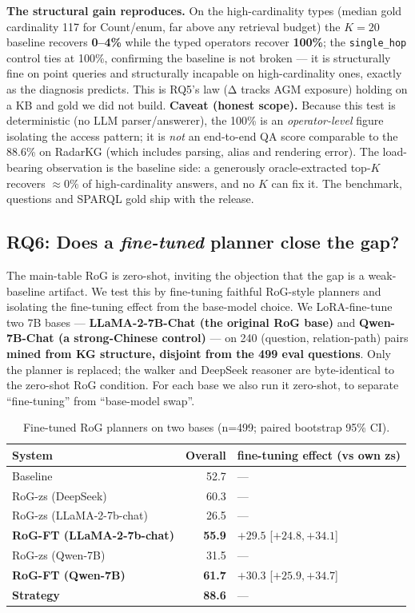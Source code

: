 \documentclass[review]{elsarticle}
\newcommand{\qtype}[1]{\texttt{\small #1}}
\begin{document}
\textbf{The structural gain reproduces.} On the high-cardinality types (median gold cardinality 117 for Count/enum, far above any retrieval budget) the $K{=}20$ baseline recovers \textbf{0--4\%} while the typed operators recover \textbf{100\%}; the \qtype{single\_hop} control ties at 100\%, confirming the baseline is not broken --- it is structurally fine on point queries and structurally incapable on high-cardinality ones, exactly as the diagnosis predicts. This is RQ5's law (Δ tracks AGM exposure) holding on a KB and gold we did not build. \textbf{Caveat (honest scope).} Because this test is deterministic (no LLM parser/answerer), the 100\% is an \emph{operator-level} figure isolating the access pattern; it is \emph{not} an end-to-end QA score comparable to the 88.6\% on RadarKG (which includes parsing, alias and rendering error). The load-bearing observation is the baseline side: a generously oracle-extracted top-$K$ recovers ${\approx}0\%$ of high-cardinality answers, and no $K$ can fix it. The benchmark, questions and SPARQL gold ship with the release.

\subsection{RQ6: Does a \emph{fine-tuned} planner close the gap?}
\label{sec:rq6}

The main-table RoG is zero-shot, inviting the objection that the gap is a weak-baseline artifact. We test this by fine-tuning faithful RoG-style planners and isolating the fine-tuning effect from the base-model choice. We LoRA-fine-tune two 7B bases --- \textbf{LLaMA-2-7B-Chat (the original RoG base)} and \textbf{Qwen-7B-Chat (a strong-Chinese control)} --- on 240 (question, relation-path) pairs \textbf{mined from KG structure, disjoint from the 499 eval questions}. Only the planner is replaced; the walker and DeepSeek reasoner are byte-identical to the zero-shot RoG condition. For each base we also run it zero-shot, to separate ``fine-tuning'' from ``base-model swap''.

\begin{table}[h]
\centering
\small
\caption{Fine-tuned RoG planners on two bases (n=499; paired bootstrap 95\% CI).}
\label{tab:rogft}
\begin{tabular}{l r l}
\toprule
\textbf{System} & \textbf{Overall} & \textbf{fine-tuning effect (vs own zs)} \\
\midrule
Baseline                  & 52.7 & --- \\
RoG-zs (DeepSeek)         & 60.3 & --- \\
RoG-zs (LLaMA-2-7b-chat)  & 26.5 & --- \\
\textbf{RoG-FT (LLaMA-2-7b-chat)} & \textbf{55.9} & $\mathbf{+29.5}$ [$+24.8,+34.1$] \\
RoG-zs (Qwen-7B)          & 31.5 & --- \\
\textbf{RoG-FT (Qwen-7B)} & \textbf{61.7} & $\mathbf{+30.3}$ [$+25.9,+34.7$] \\
\textbf{Strategy}        & \textbf{88.6} & --- \\
\bottomrule
\end{tabular}
\end{table}
\end{document}
